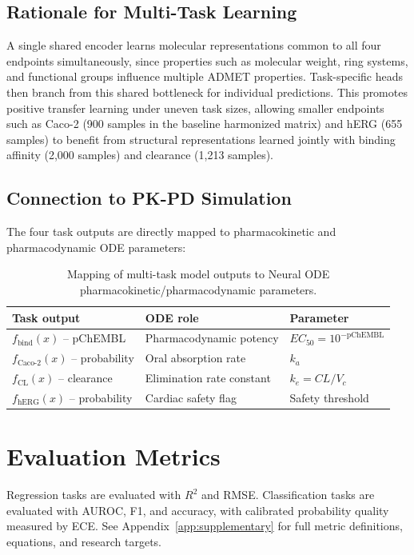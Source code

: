 \documentclass[a4paper,11pt,twoside]{report}
\begin{document}
\subsection*{Rationale for Multi-Task Learning}

A single shared encoder learns molecular representations common to all four endpoints simultaneously, since properties such as molecular weight, ring systems, and functional groups influence multiple ADMET properties. Task-specific heads then branch from this shared bottleneck for individual predictions. This promotes positive transfer learning under uneven task sizes, allowing smaller endpoints such as Caco-2 (900 samples in the baseline harmonized matrix) and hERG (655 samples) to benefit from structural representations learned jointly with binding affinity (2,000 samples) and clearance (1,213 samples).

\subsection*{Connection to PK-PD Simulation}

The four task outputs are directly mapped to pharmacokinetic and pharmacodynamic ODE parameters:

\begin{table}[htbp]
\centering
\caption{Mapping of multi-task model outputs to Neural ODE pharmacokinetic/pharmacodynamic parameters.}
\begin{tabular}{lll}
\hline
\textbf{Task output} & \textbf{ODE role} & \textbf{Parameter} \\
\hline
$f_{\text{bind}}(x)$ -- pChEMBL & Pharmacodynamic potency & $EC_{50} = 10^{-\text{pChEMBL}}$ \\
$f_{\text{Caco-2}}(x)$ -- probability & Oral absorption rate & $k_a$ \\
$f_{\text{CL}}(x)$ -- clearance & Elimination rate constant & $k_e = CL/V_c$ \\
$f_{\text{hERG}}(x)$ -- probability & Cardiac safety flag & Safety threshold \\
\hline
\end{tabular}
\end{table}

\section{Evaluation Metrics}


Regression tasks are evaluated with $R^2$ and RMSE. Classification tasks are evaluated with AUROC, F1, and accuracy, with calibrated probability quality measured by ECE. See Appendix~\ref{app:supplementary} for full metric definitions, equations, and research targets.
\end{document}
